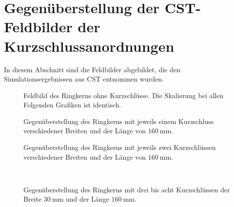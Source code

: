 \section{Gegen\"uberstellung der CST-Feldbilder der Kurzschlussanordnungen}
\label{sec:allfieldplots}
In diesem Abschnitt sind die Feldbilder abgebildet, die den Simulationsergebnissen aus CST entnommen wurden.
\begin{figure}[htb]
	\centering
	\caption{Feldbild des Ringkerns ohne Kurzschl\"usse. Die Skalierung bei allen Folgenden Grafiken ist identisch.}
	\label{fig:field0ks}
\end{figure}

\begin{figure}[htb]
	\centering
	\caption{Gegen\"uberstellung des Ringkerns mit jeweils einem Kurzschluss verschiedener Breiten und der Länge von $\SI{160}{\milli\meter}$.}
	\label{fig:field1ks}
\end{figure}

\begin{figure}[htb]
	\centering
	\caption{Gegen\"uberstellung des Ringkerns mit jeweils zwei Kurzschl\"ussen verschiedener Breiten und der Länge von $\SI{160}{\milli\meter}$.}
	\label{fig:field2ks}
\end{figure}

\begin{figure}[htb]
	\centering
    \\
	\caption{Gegen\"uberstellung des Ringkerns mit drei bis acht Kurzschl\"ussen der Breite $\SI{30}{\milli\meter}$ und der Länge $\SI{160}{\milli\meter}$.}
	\label{fig:field3bis8ks}
\end{figure}
